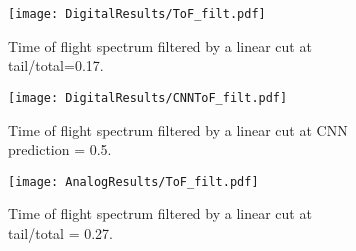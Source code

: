 \documentclass[main.tex]{subfiles}
\begin{document}
\begin{figure}
    \centering
    \begin{subfigure}[bh]{\textwidth}
   	    \centering
        \texttt{[image: DigitalResults/ToF\_filt.pdf]}
        \caption{Time of flight spectrum filtered by a linear cut at tail/total=0.17.}
        \label{fig:tof_filt_cc}
    \end{subfigure}
	\begin{subfigure}[bh]{\textwidth}
	    \centering
        \texttt{[image: DigitalResults/CNNToF\_filt.pdf]}
        \caption{Time of flight spectrum filtered by a linear cut at CNN prediction = 0.5.}
        \label{fig:tof_digi_filt_cnn}
    \end{subfigure}
	\begin{subfigure}[bh]{\textwidth}
   	   	\centering
	    \texttt{[image: AnalogResults/ToF\_filt.pdf]}
        \label{fig:A_tof_filt_cc}
    	\caption{Time of flight spectrum filtered by a linear cut at tail/total = 0.27.}
    	\label{fig:tof_cc_cnn}
    	\end{subfigure}
	\caption{}
    \label{fig:tof_cc_cnn}
\end{figure}
\end{document}
